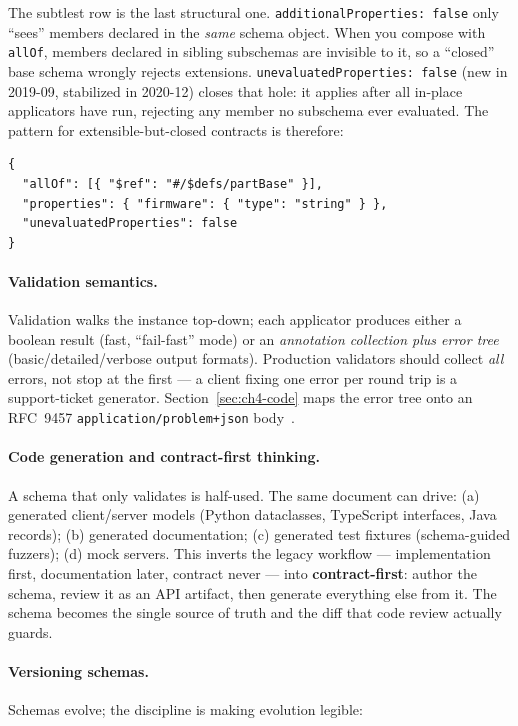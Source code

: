 The subtlest row is the last structural one. \texttt{additionalProperties: false}
only ``sees'' members declared in the \emph{same} schema object. When you compose with
\texttt{allOf}, members declared in sibling subschemas are invisible to it, so a
``closed'' base schema wrongly rejects extensions. \texttt{unevaluatedProperties:
false} (new in 2019-09, stabilized in 2020-12) closes that hole: it applies after all
in-place applicators have run, rejecting any member no subschema ever evaluated. The
pattern for extensible-but-closed contracts is therefore:

\begin{verbatim}
{
  "allOf": [{ "$ref": "#/$defs/partBase" }],
  "properties": { "firmware": { "type": "string" } },
  "unevaluatedProperties": false
}
\end{verbatim}

\paragraph{Validation semantics.}
Validation walks the instance top-down; each applicator produces either a boolean
result (fast, ``fail-fast'' mode) or an \emph{annotation collection plus error tree}
(basic/detailed/verbose output formats). Production validators should collect
\emph{all} errors, not stop at the first --- a client fixing one error per round
trip is a support-ticket generator. Section~\ref{sec:ch4-code} maps the error tree
onto an RFC~9457 \texttt{application/problem+json} body~\cite{rfc9457}.

\paragraph{Code generation and contract-first thinking.}
A schema that only validates is half-used. The same document can drive:
(a) generated client/server models (Python dataclasses, TypeScript interfaces, Java
records); (b) generated documentation; (c) generated test fixtures (schema-guided
fuzzers); (d) mock servers. This inverts the legacy workflow --- implementation
first, documentation later, contract never --- into \textbf{contract-first}:
author the schema, review it as an API artifact, then generate everything else from
it. The schema becomes the single source of truth and the diff that code review
actually guards.

\paragraph{Versioning schemas.}
Schemas evolve; the discipline is making evolution legible:

